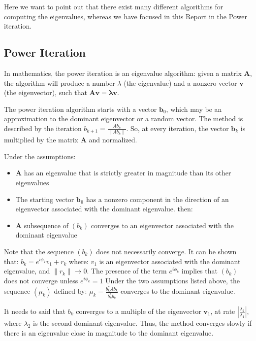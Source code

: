 Here we want to point out that there exist many different algorithms for computing the eigenvalues, whereas we have focused in this Report in the Power iteration. 

\subsection{Power Iteration}
In mathematics, the power iteration is an eigenvalue algorithm: given a matrix $\mathbf{A}$, the algorithm will produce a number $\lambda$ (the eigenvalue) and a nonzero vector $\mathbf{v}$ (the eigenvector), such that $\mathbf{Av} = \mathbf{\lambda v}$.

The power iteration algorithm starts with a vector $\mathbf{b}_0$, which may be an approximation to the dominant eigenvector or a random vector. The method is described by the iteration $ b_{k+1} = \frac{Ab_k}{\|Ab_k\|}$.
So, at every iteration, the vector $\mathbf{b}_k$ is multiplied by the matrix $\mathbf{A}$ and normalized.

Under the assumptions:
\begin{itemize}
\item $\mathbf{A}$ has an eigenvalue that is strictly greater in magnitude than its other eigenvalues
\item The starting vector $\mathbf{b_{0}}$ has a nonzero component in the direction of an eigenvector associated with the dominant eigenvalue.
then:
\item $\mathbf{A}$ subsequence of $\left( b_{k} \right)$ converges to an eigenvector associated with the dominant eigenvalue
\end{itemize}

Note that the sequence $\left( b_{k} \right)$ does not necessarily converge. It can be shown that:
$b_{k} = e^{i \phi_{k}} v_{1} + r_{k}$ where: $v_{1}$ is an eigenvector associated with the dominant eigenvalue, and  $\| r_{k} \| \rightarrow 0$. The presence of the term $e^{i \phi_{k}}$ implies that $\left( b_{k} \right)$  does not converge unless $e^{i \phi_{k}} = 1$ Under the two assumptions listed above, the sequence $\left( \mu_{k} \right)$ defined by: $\mu_{k} = \frac{b_{k}^{*}Ab_{k}}{b_{k}^{*}b_{k}}$ converges to the dominant eigenvalue.

It needs to said that $b_k$ converges to a multiple of the eigenvector $\mathbf{v}_1$, at rate $ \left| \frac{\lambda_2}{\lambda_1} \right| $, where $\lambda_2$ is the second dominant eigenvalue. Thus, the method converges slowly if there is an eigenvalue close in magnitude to the dominant eigenvalue.

